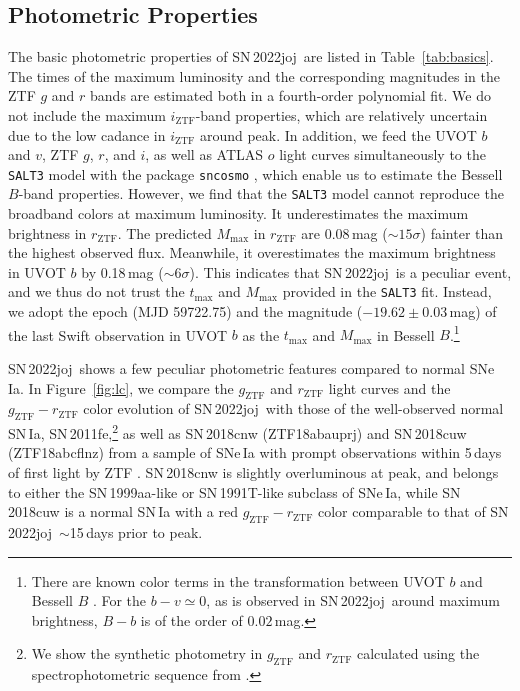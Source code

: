 \documentclass[twocolumn]{aastex631}
\newcommand{\sn}{SN\,2022joj}
\begin{document}
\begin{CJK*}{UTF8}{gbsn}
\subsection{Photometric Properties} \label{sec:analysis_phot}
The basic photometric properties of \sn\ are listed in Table~\ref{tab:basics}. The times of the maximum luminosity and the corresponding magnitudes in the ZTF $g$ and $r$ bands are estimated both in a fourth-order polynomial fit. We do not include the maximum $i_\mathrm{ZTF}$-band properties, which are relatively uncertain due to the low cadance in $i_\mathrm{ZTF}$ around peak. In addition, we feed the UVOT $b$ and $v$, ZTF $g$, $r$, and $i$, as well as ATLAS $o$ light curves simultaneously to the \texttt{SALT3} \citep{Kenworthy_SALT3_2021} model with the package \texttt{sncosmo} \citep{Barbary_SNCosmo_2023}, which enable us to estimate the Bessell $B$-band properties. However, we find that the \texttt{SALT3} model cannot reproduce the broadband colors at maximum luminosity. It underestimates the maximum brightness in $r_\mathrm{ZTF}$. The predicted $M_\mathrm{max}$ in $r_\mathrm{ZTF}$ are 0.08\,mag ($\sim$$15\sigma$) fainter than the highest observed flux. Meanwhile, it overestimates the maximum brightness in UVOT $b$ by 0.18\,mag ($\sim$$6\sigma$). This indicates that \sn\ is a peculiar event, and we thus do not trust the $t_\mathrm{max}$ and $M_\mathrm{max}$ provided in the \texttt{SALT3} fit. Instead, we adopt the epoch (MJD 59722.75) and the magnitude ($-19.62\pm0.03$\,mag) of the last Swift observation in UVOT $b$ as the $t_\mathrm{max}$ and $M_\mathrm{max}$ in Bessell $B$.\footnote{There are known color terms in the transformation between UVOT $b$ and Bessell $B$ \citep{Poole_Swift_2008}. For the $b-v\simeq0$, as is observed in \sn\ around maximum brightness, $B-b$ is of the order of $0.02$\,mag.}

\sn\ shows a few peculiar photometric features compared to normal SNe\,Ia. In Figure~\ref{fig:lc}, we compare the $g_\mathrm{ZTF}$ and $r_\mathrm{ZTF}$ light curves and the $g_\mathrm{ZTF} - r_\mathrm{ZTF}$ color evolution of \sn\ with those of the well-observed normal SN\,Ia, SN\,2011fe,\footnote{We show the synthetic photometry in $g_\mathrm{ZTF}$ and $r_\mathrm{ZTF}$ calculated using the spectrophotometric sequence from \citet{Pereira_2013}.} as well as SN\,2018cnw (ZTF18abauprj) and SN\,2018cuw (ZTF18abcflnz) from a sample of SNe\,Ia with prompt observations within 5\,days of first light by ZTF \citep{Yao_2019,Bulla2020}. 
SN\,2018cnw is slightly overluminous at peak, and belongs to either the SN\,1999aa-like \citep[99aa-like;][]{Garavini_99aa_2004} or SN\,1991T-like \citep[91T-like;][]{Filippenko_91T_1992} subclass of SNe\,Ia, while SN\,2018cuw is a normal SN\,Ia with a red $g_\mathrm{ZTF} - r_\mathrm{ZTF}$ color comparable to that of \sn\ $\sim$15\,days prior to peak. 


\end{CJK*}
\end{document}
